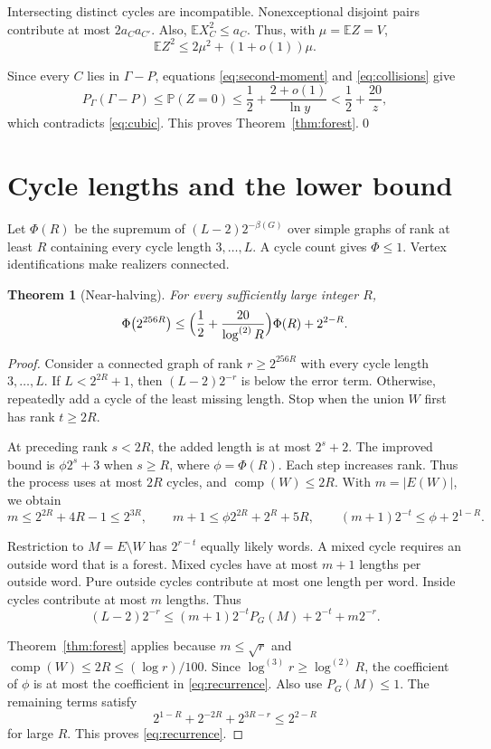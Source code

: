 \documentclass[11pt,a4paper]{article}
\numberwithin{equation}{section}
\newtheorem{theorem}{Theorem}[section]
\theoremstyle{definition}
\theoremstyle{remark}
\newcommand{\E}{\mathbb E}
\newcommand{\Prob}{\mathbb P}
\newcommand{\cc}{\operatorname{comp}}
\begin{document}
Intersecting distinct cycles are incompatible. Nonexceptional disjoint pairs contribute at most $2a_Ca_{C'}$. Also, $\E X_C^2\le a_C$. Thus, with $\mu=\E Z=V$,
\[
 \E Z^2\le2\mu^2+(1+o(1))\mu.
\]

Since every $C$ lies in $\Gamma-P$, equations \eqref{eq:second-moment} and \eqref{eq:collisions} give
\[
 P_\Gamma(\Gamma-P)\le\Prob(Z=0)\le\frac12+\frac{2+o(1)}{\ln y}<\frac12+\frac{20}z,
\]
which contradicts \eqref{eq:cubic}. This proves Theorem~\ref{thm:forest}.\qed

\section{Cycle lengths and the lower bound}\label{sec:recurrence}
Let $\Phi(R)$ be the supremum of $(L-2)2^{-\beta(G)}$ over simple graphs of rank at least $R$ containing every cycle length $3,\ldots,L$. A cycle count gives $\Phi\le1$. Vertex identifications make realizers connected.

\begin{theorem}[Near-halving]\label{thm:recurrence}
For every sufficiently large integer $R$,
\begin{equation}\label{eq:recurrence}
 \Phi\bigl(2^{256R}\bigr)\le\Bigl(\frac12+\frac{20}{\log^{(2)}R}\Bigr)\Phi(R)+2^{2-R}.
\end{equation}
\end{theorem}

\begin{proof}
Consider a connected graph of rank $r\ge2^{256R}$ with every cycle length $3,\ldots,L$. If $L<2^{2R}+1$, then $(L-2)2^{-r}$ is below the error term. Otherwise, repeatedly add a cycle of the least missing length. Stop when the union $W$ first has rank $t\ge2R$.

At preceding rank $s<2R$, the added length is at most $2^s+2$. The improved bound is $\phi2^s+3$ when $s\ge R$, where $\phi=\Phi(R)$. Each step increases rank. Thus the process uses at most $2R$ cycles, and $\cc(W)\le2R$. With $m=|E(W)|$, we obtain
\[
 m\le2^{2R}+4R-1\le2^{3R},\qquad m+1\le\phi2^{2R}+2^R+5R,\qquad(m+1)2^{-t}\le\phi+2^{1-R}.
\]

Restriction to $M=E\setminus W$ has $2^{r-t}$ equally likely words. A mixed cycle requires an outside word that is a forest. Mixed cycles have at most $m+1$ lengths per outside word. Pure outside cycles contribute at most one length per word. Inside cycles contribute at most $m$ lengths. Thus
\[
 (L-2)2^{-r}\le(m+1)2^{-t}P_G(M)+2^{-t}+m2^{-r}.
\]

Theorem~\ref{thm:forest} applies because $m\le\sqrt r$ and $\cc(W)\le2R\le(\log r)/100$. Since $\log^{(3)}r\ge\log^{(2)}R$, the coefficient of $\phi$ is at most the coefficient in \eqref{eq:recurrence}. Also use $P_G(M)\le1$. The remaining terms satisfy
\[
 2^{1-R}+2^{-2R}+2^{3R-r}\le2^{2-R}
\]
for large $R$. This proves \eqref{eq:recurrence}.
\end{proof}
\end{document}
